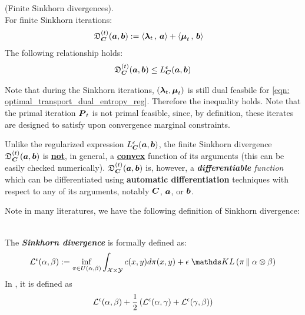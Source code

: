 \documentclass[11pt]{article}
\begin{document}
\begin{proposition} (Finite Sinkhorn divergences).\\
For finite Sinkhorn iterations:
\begin{align}
\mathfrak{D}_{\boldsymbol{C}}^{(t)}(\boldsymbol{a}, \boldsymbol{b}) &:=\left\langle \boldsymbol{\lambda}_{t}\,,\, \boldsymbol{a} \right\rangle + \left\langle \boldsymbol{\mu}_{t}\,,\, \boldsymbol{b} \right\rangle \label{eqn: sinkhorn_dual_divg_finite}
\end{align}
The following relationship holds:
\begin{align}
\mathfrak{D}_{\boldsymbol{C}}^{(t)}(\boldsymbol{a}, \boldsymbol{b}) \le L_{\boldsymbol{C}}^{\epsilon}(\boldsymbol{a}, \boldsymbol{b})    \label{eqn: sinkhorn_finite_dual_divg_inequality}
\end{align}
\end{proposition}
Note that during the Sinkhorn iterations, $(\boldsymbol{\lambda}_{t}, \boldsymbol{\mu}_{t})$ is still dual feasbile for \eqref{eqn: optimal_transport_dual_entropy_reg}. Therefore the inequality holds. Note that the primal iteration $\boldsymbol{P}_{t}$ is not primal feasible, since, by definition, these iterates are designed
to satisfy upon convergence marginal constraints.

Unlike the regularized expression $L_{\boldsymbol{C}}^{\epsilon}(\boldsymbol{a}, \boldsymbol{b})$, the finite Sinkhorn divergence $\mathfrak{D}_{\boldsymbol{C}}^{(t)}(\boldsymbol{a}, \boldsymbol{b}) $ is \underline{\textbf{not}}, in general, a \underline{\textbf{convex}} function of its arguments (this can be easily checked numerically). $\mathfrak{D}_{\boldsymbol{C}}^{(t)}(\boldsymbol{a}, \boldsymbol{b})$ is, however, a \emph{\textbf{differentiable} function} which can be differentiated using \textbf{automatic differentiation} techniques with respect to any of its arguments, notably $\boldsymbol{C}$, $\boldsymbol{a}$, or $\boldsymbol{b}$.

Note in many literatures, we have the following definition of Sinkhorn divergence:
\begin{definition} \citep{li2021hilbert}\\
The \textbf{\emph{Sinkhorn divergence}} is formally defined as: 
\begin{align}
\cL^{\epsilon}(\alpha, \beta) :=\inf_{\pi \in U(\alpha, \beta)} \int_{\cX \times \cY} c(x, y) d \pi(x, y) + \epsilon\; \kl{\pi}{\alpha\otimes \beta}
\end{align}
In \citep{vialard2019elementary}, it is defined as
\begin{align*}
{\mathcal L}^{\epsilon}(\alpha, \beta) + \frac{1}{2}\left({\mathcal L}^{\epsilon}(\alpha, \gamma) + {\mathcal L}^{\epsilon}(\gamma, \beta)\right)
\end{align*}
\end{definition}
\newpage


\end{document}
